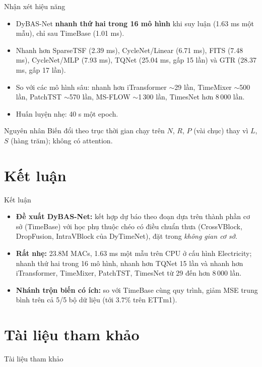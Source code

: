 \documentclass [xcolor=svgnames, notes] {beamer}
\begin{document}
\begin{frame}{Nhận xét hiệu năng}
\begin{itemize}
    \item DyBAS-Net \textbf{nhanh thứ hai trong 16 mô hình} khi suy luận (1.63 ms một mẫu), chỉ sau TimeBase (1.01 ms).
    \item Nhanh hơn SparseTSF (2.39 ms), CycleNet/Linear (6.71 ms), FITS (7.48 ms), CycleNet/MLP (7.93 ms),
          TQNet (25.04 ms, gấp 15 lần) và GTR (28.37 ms, gấp 17 lần).
    \item So với các mô hình sâu: nhanh hơn iTransformer $\sim$29 lần, TimeMixer $\sim$500 lần, PatchTST $\sim$570 lần,
          MS-FLOW $\sim$1\,300 lần, TimesNet hơn 8\,000 lần.
    \item Huấn luyện nhẹ: 40 s một epoch.
\end{itemize}

\begin{block}{Nguyên nhân}
Biến đổi theo trục thời gian chạy trên $N$, $R$, $P$ (vài chục) thay vì $L$, $S$ (hàng trăm); không có attention.
\end{block}
\end{frame}

\section{Kết luận}

\begin{frame}{Kết luận}
\begin{itemize}
    \item \textbf{Đề xuất DyBAS-Net:} kết hợp dự báo theo đoạn dựa trên thành phần cơ sở (TimeBase) với học phụ thuộc chéo
          có điều chuẩn thưa (CrossVBlock, DropFusion, IntraVBlock của DyTimeNet), đặt trong \emph{không gian cơ sở}.
    \item \textbf{Rất nhẹ:} 23.8M MACs, 1.63 ms một mẫu trên CPU ở cấu hình Electricity; nhanh thứ hai trong 16 mô hình,
          nhanh hơn TQNet 15 lần và nhanh hơn iTransformer, TimeMixer, PatchTST, TimesNet từ 29 đến hơn 8\,000 lần.
    \item \textbf{Nhánh trộn biến có ích:} so với TimeBase cùng quy trình, giảm MSE trung bình trên cả 5/5 bộ dữ liệu (tới
          $3.7\%$ trên ETTm1).
\end{itemize}
\end{frame}

\section{Tài liệu tham khảo}
\begin{frame}[allowframebreaks]{Tài liệu tham khảo}
    \renewcommand*{\bibfont}{\tiny}
    \printbibliography[heading=none]
\end{frame}
\end{document}
